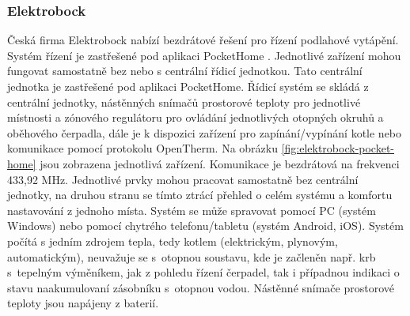 \subsubsection{Elektrobock}
Česká firma Elektrobock \cite{elektrobock-stranky} nabízí bezdrátové řešení pro řízení podlahové vytápění. Systém řízení je zastřešené pod aplikaci PocketHome \cite{pockethome-stranky}. Jednotlivé zařízení mohou fungovat samostatně bez nebo s centrální řídicí jednotkou. Tato centrální jednotka je zastřešené pod aplikaci PocketHome. Řídicí systém se skládá z centrální jednotky, nástěnných snímačů prostorové teploty pro jednotlivé místnosti a zónového regulátoru pro ovládání jednotlivých otopných okruhů a oběhového čerpadla, dále je k dispozici zařízení pro zapínání/vypínání kotle nebo komunikace pomocí protokolu OpenTherm. Na obrázku \ref{fig:elektrobock-pocket-home} jsou zobrazena jednotlivá zařízení. Komunikace je bezdrátová na frekvenci 433,92 MHz. Jednotlivé prvky mohou pracovat samostatně bez centrální jednotky, na druhou stranu se tímto ztrácí přehled o celém systému a komfortu nastavování z jednoho místa. Systém se může spravovat pomocí PC (systém Windows) nebo pomocí chytrého telefonu/tabletu (systém Android, iOS). Systém počítá s jedním zdrojem tepla, tedy kotlem (elektrickým, plynovým, automatickým), neuvažuje se s~otopnou soustavu, kde je začleněn např. krb s~tepelným výměníkem, jak z pohledu řízení čerpadel, tak i případnou indikaci o stavu naakumulovaní zásobníku s~otopnou vodou. Nástěnné snímače prostorové teploty jsou napájeny z baterií.


